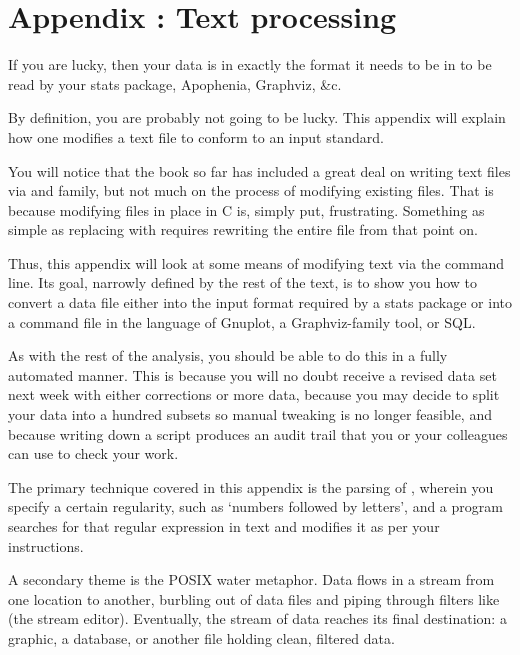 \renewcommand\thechapter{\Alph{chapter}}
\setcounter{chapter}{1}
\setcounter{section}{0}
\setcounter{subsection}{0}
\setcounter{ex}{0}
\chapter{Appendix \thechapter: Text processing} \label{textappendix}

If you are lucky, then your data is in exactly the format it needs to be
in to be read by your stats package, Apophenia, Graphviz, \&c.

By definition, you are probably not going to be lucky. This appendix will
explain how one modifies a text file to conform to an input standard. 

You will notice that the book so far has included a great deal on writing
text files via  and family, but not much on the process of
modifying existing files. That is because modifying files in place in
C is, simply put, frustrating. Something as simple as replacing 
with  requires rewriting the entire file from that point on.

Thus, this appendix will look at some means of modifying text via the
command line. Its goal, narrowly defined by the rest of the text, is to
show you how to convert a data file either into the input format required
by a stats package or into a command file in the language of Gnuplot,
a Graphviz-family tool, or SQL.

As with the rest of the analysis, you should be able to do this in a
fully automated manner. This is because you will no doubt receive a
revised data set next week with either corrections or more data, because
you may decide to split your data into a hundred subsets so manual
tweaking is no longer feasible, and because writing down a script
produces an audit trail that you or your colleagues can use to check
your work.

The primary technique covered in this appendix is the parsing of
, wherein you specify a certain regularity,
such as `numbers followed by letters', and a program searches for that
regular expression in text and modifies it as per your instructions.

A secondary theme is the POSIX water metaphor. Data flows in a stream from
one location to another, burbling out of data files and piping through
filters like  (the stream editor).  Eventually, the stream of
data reaches its final destination: a graphic, a database, or another
file holding clean, filtered data.

